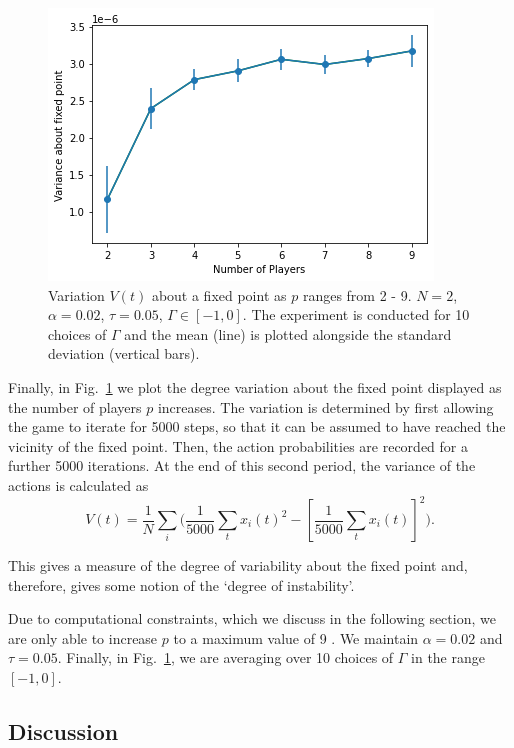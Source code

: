 \documentclass{article}
\begin{document}
\begin{figure}[t]
    \includegraphics[width = .9\linewidth, center]{Figures/pVarianceExpt.png}
    \caption{Variation $V(t)$ about a fixed point as $p$ ranges from 2 - 9. $N = 2$, $\alpha = 0.02$, $\tau = 0.05$, $\Gamma \in [-1, 0]$. The experiment is conducted for 10 choices of $\Gamma$ and the mean (line) is plotted alongside the standard deviation (vertical bars).}
    \label{fig:pVarianceExpt}
\end{figure}

Finally, in Fig.~\ref{fig:pVarianceExpt} we plot the degree variation about the fixed point displayed as the number of players $p$ increases. The variation is determined by first allowing the game to iterate for 5000 steps, so that it can be assumed to have reached the vicinity of the fixed point. Then, the action probabilities are recorded for a further 5000 iterations. At the end of this second period, the variance of the actions is calculated as
%
\begin{equation*}
    V(t) = \frac{1}{N} \sum_i \big ( \frac{1}{5000} \sum_t x_i(t)^2 - \left[\frac{1}{5000} \sum_t x_i(t) \right]^2 \big ).
\end{equation*}

This gives a measure of the degree of variability about the fixed point and, therefore, gives some notion of the `degree of instability'.

Due to computational constraints, which we discuss in the following section, we are only able to increase $p$ to a maximum value of 9 . We maintain $\alpha = 0.02$ and $\tau = 0.05$. Finally, in Fig.~\ref{fig:pVarianceExpt}, we are averaging over 10 choices of $\Gamma$ in the range $[-1, 0]$. 

\subsection{Discussion}
    
\end{document}

